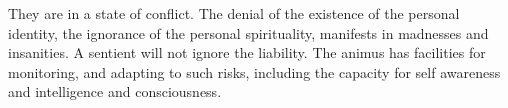 

﻿They are in a state of conflict.  The denial of the existence of the
personal identity, the ignorance of the personal spirituality,
manifests in madnesses and insanities.  A sentient will not ignore the
liability.  The animus has facilities for monitoring, and adapting to
such risks, including the capacity for self awareness and intelligence
and consciousness.

\bye
